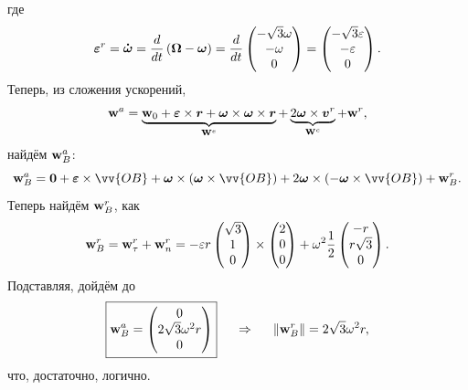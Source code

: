где
$$
    \mbox{\boldmath $\varepsilon$}^r = \mbox{\boldmath $\dot{\omega}$} = \frac{d}{dt} \left(\mbox{\boldmath $\Omega$} - \mbox{\boldmath $\omega$}\right) = \frac{d}{dt} \begin{pmatrix}
        - \sqrt{3} \omega \\ -\omega \\ 0
    \end{pmatrix} = \begin{pmatrix}
        - \sqrt{3} \varepsilon \\ - \varepsilon \\ 0
    \end{pmatrix}.
$$
Теперь, из сложения ускорений,
$$
    \mbox{\boldmath $\mathrm{w}$}^a = \underbrace{\mbox{\boldmath $\mathrm{w}$}_0 + \mbox{\boldmath $\varepsilon$} \times \mbox{\boldmath $r$} + \mbox{\boldmath $\omega$} \times \mbox{\boldmath $\omega$} \times \mbox{\boldmath $r$}}_{\mbox{\boldmath $\mathrm{w}$}^e} + \underbrace{2 \mbox{\boldmath $\omega$} \times \mbox{\boldmath $v$}^r}_{\mbox{\boldmath $\mathrm{w}$}^c} + \mbox{\boldmath $\mathrm{w}$}^r,
$$
найдём $\mbox{\boldmath $\mathrm{w}$}_B^a$:
$$
    \vc{\mathrm{w}}_B^a = \vc{0} + \vc{\varepsilon} \times \vv{OB} + \vc{\omega} \times \left(
        \vc{\omega} \times \vv{OB}
    \right) + 2 \vc{\omega} \times \left(- \vc{\omega} \times \vv{OB} \right) + \vc{\mathrm{w}}^r_B.
$$
Теперь найдём $\mbox{\boldmath $\mathrm{w}$}^r_B$, как
$$
    \mbox{\boldmath $\mathrm{w}$}^r_B = \mbox{\boldmath $\mathrm{w}$}_{\tau}^r + \mbox{\boldmath $\mathrm{w}$}_n^r =
    - \varepsilon r \begin{pmatrix}
        \sqrt{3} \\ 1 \\ 0
    \end{pmatrix} \times \begin{pmatrix}
        2 \\ 0 \\ 0
    \end{pmatrix} + \omega^2 \frac{1}{2} \begin{pmatrix}
        - r \\ r \sqrt{3} \\ 0
    \end{pmatrix}.
$$
Подставляя, дойдём до
$$
    \boxed{\mbox{\boldmath $\mathrm{w}$}_B^a = \begin{pmatrix}
        0 \\ 2 \sqrt{3} \omega^2 r \\ 0
    \end{pmatrix}}
    \hspace{0.5cm} \Rightarrow \hspace{0.5cm} 
    \|\mbox{\boldmath $\mathrm{w}$}^r_B\| = 2 \sqrt{3} \omega^2 r,
$$
что, достаточно, логично.

